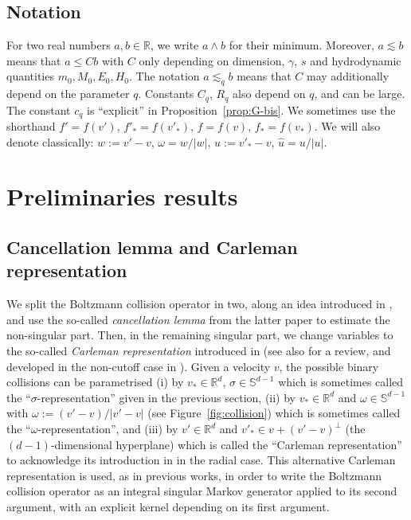 \documentclass[11pt]{article}
\theoremstyle{plain}
\theoremstyle{definition}
\numberwithin{equation}{section}
\newcommand{\R}{\mathbb R}
\begin{document}
\subsection{Notation} For two real numbers $a,b \in \R$, we write
$a \wedge b$ for their minimum. Moreover, $a \lesssim b$ means that
$ a \le C b$ with $C$ only depending on dimension, $\gamma$, $s$ and
hydrodynamic quantities $m_0, M_0, E_0, H_0$. The notation
$a \lesssim_q b$ means that $C$ may additionally depend on the
parameter $q$. Constants $C_q$, $R_q$ also depend on $q$, and can be
large. The constant $c_q$ is ``explicit'' in
Proposition~\ref{prop:G-bis}. We sometimes use the shorthand
$f'=f(v')$, $f'_*=f(v'_*)$, $f=f(v)$, $f_*=f(v_*)$. We will also
denote classically: $w:=v'-v$, $\omega = w/|w|$, $u:=v'_*-v$,
$\hat u = u/|u|$.

\section{Preliminaries results}
\label{s:prelim}

\subsection{Cancellation lemma and Carleman representation}

We split the Boltzmann collision operator in two, along an idea
introduced in \cite{advw}, and use the so-called \emph{cancellation
lemma} from the latter paper to estimate the non-singular
part. Then, in the remaining singular part, we change variables to the
so-called \emph{Carleman representation} introduced in
\cite{MR1555365,MR0098477} (see also
\cite[\S 4.6]{villani-book} for a review, and developed in the
non-cutoff case in \cite[\S 4]{luis}). Given a velocity $v$, the
possible binary collisions can be parametrised (i) by $v_* \in \R^d$,
$\sigma \in \mathbb S^{d-1}$ which is sometimes called the
``$\sigma$-representation'' given in the previous section, (ii) by
$v_* \in \R^d$ and $\omega \in \mathbb S^{d-1}$ with
$\omega := (v'-v)/|v'-v|$ (see Figure~\ref{fig:collision}) which is
sometimes called the ``$\omega$-representation'', and (iii) by
$v' \in \R^d$ and $v'_* \in v + (v'-v)^\bot$ (the $(d-1)$-dimensional
hyperplane) which is called the ``Carleman representation'' to
acknowledge its introduction in \cite{MR1555365} in the radial
case. This alternative Carleman representation is used, as in previous
works, in order to write the Boltzmann collision operator as an
integral singular Markov generator applied to its second argument,
with an explicit kernel depending on its first argument.
\end{document}
